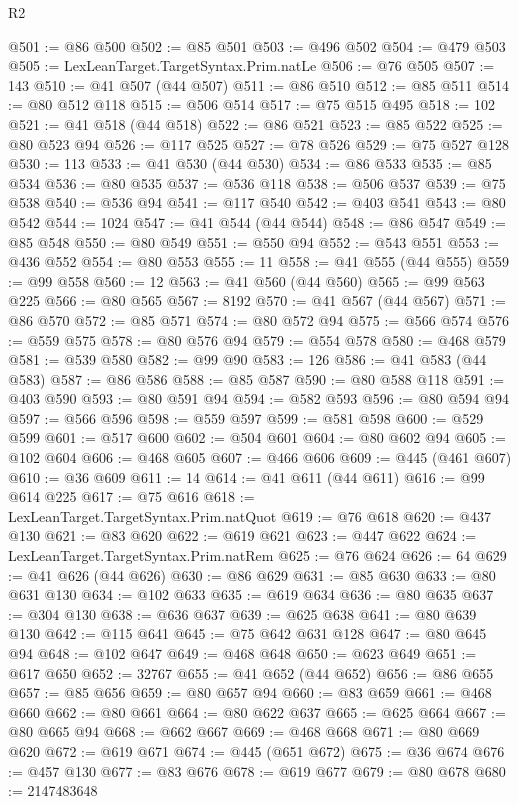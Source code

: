 \begin{lexlean}{R2}
\begin{coremodule}
@501 := @86 @500
@502 := @85 @501
@503 := @496 @502
@504 := @479 @503
@505 := LexLeanTarget.TargetSyntax.Prim.natLe
@506 := @76 @505
@507 := 143
@510 := @41 @507 (@44 @507)
@511 := @86 @510
@512 := @85 @511
@514 := @80 @512 @118
@515 := @506 @514
@517 := @75 @515 @495
@518 := 102
@521 := @41 @518 (@44 @518)
@522 := @86 @521
@523 := @85 @522
@525 := @80 @523 @94
@526 := @117 @525
@527 := @78 @526
@529 := @75 @527 @128
@530 := 113
@533 := @41 @530 (@44 @530)
@534 := @86 @533
@535 := @85 @534
@536 := @80 @535
@537 := @536 @118
@538 := @506 @537
@539 := @75 @538
@540 := @536 @94
@541 := @117 @540
@542 := @403 @541
@543 := @80 @542
@544 := 1024
@547 := @41 @544 (@44 @544)
@548 := @86 @547
@549 := @85 @548
@550 := @80 @549
@551 := @550 @94
@552 := @543 @551
@553 := @436 @552
@554 := @80 @553
@555 := 11
@558 := @41 @555 (@44 @555)
@559 := @99 @558
@560 := 12
@563 := @41 @560 (@44 @560)
@565 := @99 @563 @225
@566 := @80 @565
@567 := 8192
@570 := @41 @567 (@44 @567)
@571 := @86 @570
@572 := @85 @571
@574 := @80 @572 @94
@575 := @566 @574
@576 := @559 @575
@578 := @80 @576 @94
@579 := @554 @578
@580 := @468 @579
@581 := @539 @580
@582 := @99 @90
@583 := 126
@586 := @41 @583 (@44 @583)
@587 := @86 @586
@588 := @85 @587
@590 := @80 @588 @118
@591 := @403 @590
@593 := @80 @591 @94
@594 := @582 @593
@596 := @80 @594 @94
@597 := @566 @596
@598 := @559 @597
@599 := @581 @598
@600 := @529 @599
@601 := @517 @600
@602 := @504 @601
@604 := @80 @602 @94
@605 := @102 @604
@606 := @468 @605
@607 := @466 @606
@609 := @445 (@461 @607)
@610 := @36 @609
@611 := 14
@614 := @41 @611 (@44 @611)
@616 := @99 @614 @225
@617 := @75 @616
@618 := LexLeanTarget.TargetSyntax.Prim.natQuot
@619 := @76 @618
@620 := @437 @130
@621 := @83 @620
@622 := @619 @621
@623 := @447 @622
@624 := LexLeanTarget.TargetSyntax.Prim.natRem
@625 := @76 @624
@626 := 64
@629 := @41 @626 (@44 @626)
@630 := @86 @629
@631 := @85 @630
@633 := @80 @631 @130
@634 := @102 @633
@635 := @619 @634
@636 := @80 @635
@637 := @304 @130
@638 := @636 @637
@639 := @625 @638
@641 := @80 @639 @130
@642 := @115 @641
@645 := @75 @642 @631 @128
@647 := @80 @645 @94
@648 := @102 @647
@649 := @468 @648
@650 := @623 @649
@651 := @617 @650
@652 := 32767
@655 := @41 @652 (@44 @652)
@656 := @86 @655
@657 := @85 @656
@659 := @80 @657 @94
@660 := @83 @659
@661 := @468 @660
@662 := @80 @661
@664 := @80 @622 @637
@665 := @625 @664
@667 := @80 @665 @94
@668 := @662 @667
@669 := @468 @668
@671 := @80 @669 @620
@672 := @619 @671
@674 := @445 (@651 @672)
@675 := @36 @674
@676 := @457 @130
@677 := @83 @676
@678 := @619 @677
@679 := @80 @678
@680 := 2147483648

\end{coremodule}
\end{lexlean}
